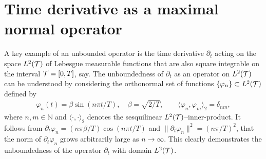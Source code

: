 \documentclass[amsa]{ipart}
\begin{document}
\section{Time derivative as a maximal normal
  operator}\label{app:Time_Derivative}
%
A key example of an unbounded operator is the time derivative
$\partial_t$ acting on the space $L^2(\mathcal{T})$ of Lebesgue measurable functions
that are also square integrable on the interval $\mathcal{T}=[0,T]$, say. The
unboundedness of $\partial_t$ as an operator on $L^2(\mathcal{T})$ can be 
understood by considering the orthonormal set of functions
$\{\varphi_n\}\subset L^2(\mathcal{T})$ defined by     
%
\begin{align}\label{eq:Orthonormal}
  \varphi_n(t)=\beta\sin(n\pi t/T), \quad
  \beta=\sqrt{2/T},
  \qquad
  \langle\varphi_n,\varphi_m\rangle_2=\delta_{nm},
\end{align}
%
where $n,m\in\mathbb{N}$ and $\langle\cdot,\cdot\rangle_2$ denotes the sesquilinear
$L^2(\mathcal{T})$--inner-product. It follows from $\partial_t\varphi_n=(n\pi\beta/T)\cos(n\pi t/T)$
and $\|\partial_t\varphi_n\|^2=(n\pi/T)^2$, that the norm of $\partial_t\varphi_n$ grows arbitrarily
large as $n\to\infty$. This clearly demonstrates the unboundedness of the
operator $\partial_t$ with domain $L^2(\mathcal{T})$.  
\end{document}
